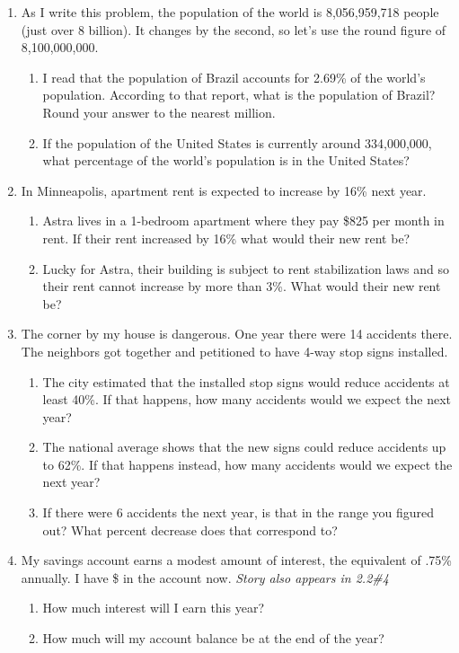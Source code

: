 \begin{enumerate}

\item As I write this problem, the population of the world is 8,056,959,718 people (just over 8 billion).  It changes by the second, so let's use the round figure of 8,100,000,000.
\begin{enumerate}
\item I read that the population of Brazil accounts for 2.69\% of the world's population.  According to that report, what is the population of Brazil?  Round your answer to the nearest million.  \vfill
\item If the population of the United States is currently around 334,000,000, what percentage of the world's population is in the United States? \vfill
\end{enumerate}

\item In Minneapolis, apartment rent is expected to increase by 16\% next year. \begin{enumerate}
\item Astra lives in a 1-bedroom apartment where they pay \$825 per month in rent.  If their rent increased by 16\% what would their new rent be? \vfill
\item Lucky for Astra, their building is subject to rent stabilization laws and so their rent cannot increase by more than 3\%. What would their new rent be? \vfill
\end{enumerate}

\newpage

\item The corner by my house is dangerous.  One year there were 14 accidents there.  The neighbors got together and petitioned to have 4-way stop signs installed.  
\begin{enumerate}
\item The city estimated that the installed stop signs would reduce accidents at least 40\%.  If that happens, how many accidents would we expect the next year? \vfill
\item The national average shows that the new signs could reduce accidents up to 62\%.  If that happens instead, how many accidents would we expect the next year? \vfill
\item If there were 6 accidents the next year, is that in the range you figured out? What percent decrease does that correspond to? \vfill 
\end{enumerate}

\item My savings account earns a modest amount of interest, the equivalent of .75\% annually.  I have \$ in the account now.  \hspace{.7 in} \emph{Story also appears in 2.2\#4}
\begin{enumerate}
\item How much interest will I earn this year? \vfill
\item How much will my account balance be at the end of the year? \vfill
\end{enumerate}

\end{enumerate} %


